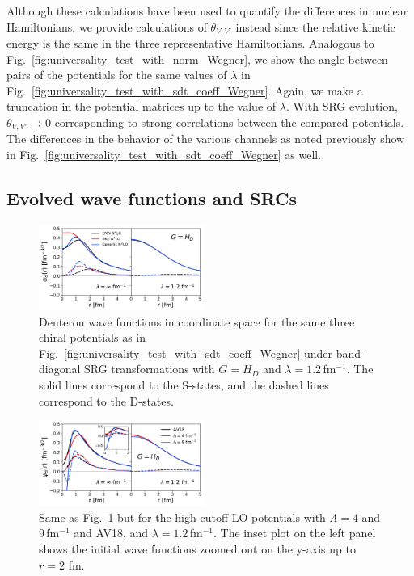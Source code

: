 \documentclass[10pt,aps,prc,floatfix,twocolumn,nofootinbib]{revtex4-1}
\begin{document}
Although these calculations have been used to quantify the differences in nuclear Hamiltonians, we provide calculations of $\theta_{V,V'}$ instead since the relative kinetic energy is the same in the three representative Hamiltonians.
Analogous to Fig.~\ref{fig:universality_test_with_norm_Wegner}, we show the angle between pairs of the potentials for the same values of $\lambda$ in Fig.~\ref{fig:universality_test_with_sdt_coeff_Wegner}.
Again, we make a truncation in the potential matrices up to the value of $\lambda$.
With SRG evolution, $\theta_{V,V'} \rightarrow 0$ corresponding to strong correlations between the compared potentials.
The differences in the behavior of the various channels as noted previously show in Fig.~\ref{fig:universality_test_with_sdt_coeff_Wegner} as well.


\subsection{Evolved wave functions and SRCs}
\label{subsec:wfs_and_SRCs}

%
\begin{figure}[t!]
    \includegraphics[clip,width=0.48\textwidth]{deuteron_wave_func_coord_space_kvnns_79_111_222_Wegner1p2.pdf}%
    \caption{Deuteron wave functions in coordinate space for the same three chiral potentials as in Fig.~\ref{fig:universality_test_with_sdt_coeff_Wegner} under band-diagonal SRG transformations with $G=H_D$ and $\lambda=1.2$\,fm$^{-1}$. The solid lines correspond to the S-states, and the dashed lines correspond to the D-states.}
    \label{fig:deuteron_wave_funcs_soft}
\end{figure}
%
\begin{figure}[tbh]
    \includegraphics[clip,width=0.48\textwidth]{deuteron_wave_func_coord_space_kvnns_6_900_901_Wegner1p2.pdf}%
    \caption{Same as Fig.~\ref{fig:deuteron_wave_funcs_soft} but for the high-cutoff LO potentials with $\Lambda=4$ and $9$\,fm$^{-1}$ and AV18, and $\lambda=1.2$\,fm$^{-1}$. The inset plot on the left panel shows the initial wave functions zoomed out on the y-axis up to $r=2$ fm.}
    \label{fig:deuteron_wave_funcs_hard}
\end{figure}
%
\end{document}
